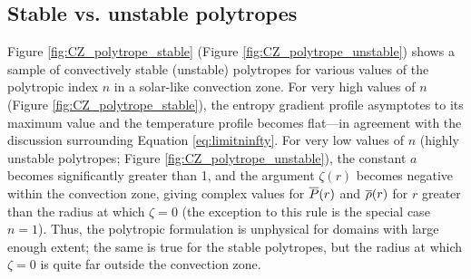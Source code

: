 \documentclass[12pt]{article}
\numberwithin{equation}{section}
\begin{document}
\subsection{Stable vs. unstable polytropes}
Figure \ref{fig:CZ_polytrope_stable} (Figure \ref{fig:CZ_polytrope_unstable}) shows a sample of convectively stable (unstable) polytropes for various values of the polytropic index $n$ in a solar-like convection zone. For very high values of $n$ (Figure \ref{fig:CZ_polytrope_stable}), the entropy gradient profile asymptotes to its maximum value and the temperature profile becomes flat---in agreement with the discussion surrounding Equation \eqref{eq:limitninfty}. For very low values of $n$ (highly unstable polytropes; Figure \ref{fig:CZ_polytrope_unstable}), the constant $a$ becomes significantly greater than 1, and the argument $\zeta(r)$ becomes negative within the convection zone, giving complex values for $\overline{P}(r)$ and $\overline{\rho}(r)$ for $r$ greater than the radius at which $\zeta=0$ (the exception to this rule is the special case $n=1$). Thus, the polytropic formulation is unphysical for domains with large enough extent; the same is true for the stable polytropes, but the radius at which $\zeta=0$ is quite far outside the convection zone.
\end{document}

